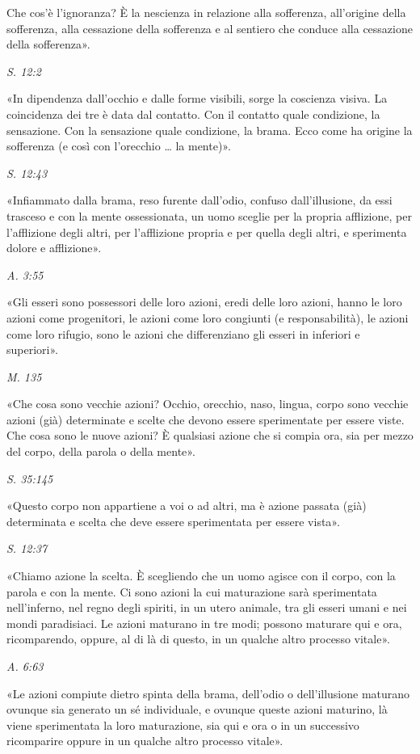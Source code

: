 Che cos’è
l’ignoranza? È la nescienza in relazione alla sofferenza, all’origine
della sofferenza, alla cessazione della sofferenza e al sentiero che
conduce alla cessazione della sofferenza».


\emph{S. 12:2}


«In dipendenza dall’occhio e dalle forme visibili, sorge la coscienza
visiva. La coincidenza dei tre è data dal contatto. Con il contatto
quale condizione, la sensazione. Con la sensazione quale condizione, la
brama. Ecco come ha origine la sofferenza (e così con l’orecchio …​ la
mente)».


\emph{S. 12:43}


«Infiammato dalla brama, reso furente dall’odio, confuso dall’illusione,
da essi trasceso e con la mente ossessionata, un uomo sceglie per la
propria afflizione, per l’afflizione degli altri, per l’afflizione
propria e per quella degli altri, e sperimenta dolore e afflizione».


\emph{A. 3:55}


«Gli esseri sono possessori delle loro azioni, eredi delle loro azioni,
hanno le loro azioni come progenitori, le azioni come loro congiunti (e
responsabilità), le azioni come loro rifugio, sono le azioni che
differenziano gli esseri in inferiori e superiori».


\emph{M. 135}


«Che cosa sono vecchie azioni? Occhio, orecchio, naso, lingua, corpo
sono vecchie azioni (già) determinate e scelte che devono essere
sperimentate per essere viste. Che cosa sono le nuove azioni? È
qualsiasi azione che si compia ora, sia per mezzo del corpo, della
parola o della mente».


\emph{S. 35:145}


«Questo corpo non appartiene a voi o ad altri, ma è azione passata (già)
determinata e scelta che deve essere sperimentata per essere vista».


\emph{S. 12:37}


«Chiamo azione la scelta. È scegliendo che un uomo agisce con il corpo,
con la parola e con la mente. Ci sono azioni la cui maturazione sarà
sperimentata nell’inferno, nel regno degli spiriti, in un utero animale,
tra gli esseri umani e nei mondi paradisiaci. Le azioni maturano in tre
modi; possono maturare qui e ora, ricomparendo, oppure, al di là di
questo, in un qualche altro processo vitale».


\emph{A. 6:63}


«Le azioni compiute dietro spinta della brama, dell’odio o
dell’illusione maturano ovunque sia generato un sé individuale, e
ovunque queste azioni maturino, là viene sperimentata la loro
maturazione, sia qui e ora o in un successivo ricomparire oppure in un
qualche altro processo vitale».


